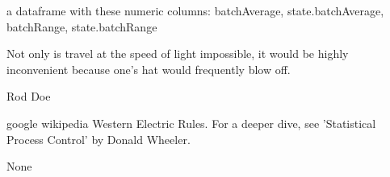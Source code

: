 \documentclass[a4paper]{book}
\begin{document}
%
\begin{Value}
a dataframe with these numeric columns:  batchAverage, state.batchAverage, batchRange, state.batchRange
\end{Value}
%
\begin{Note}\relax
Not only is travel at the speed of light impossible, it would be highly inconvenient because one's hat would frequently blow off.
\end{Note}
%
\begin{Author}\relax
Rod Doe
\end{Author}
%
\begin{References}\relax
google wikipedia Western Electric Rules.  For a deeper dive, see 'Statistical Process Control' by Donald Wheeler.
\end{References}
%
\begin{SeeAlso}\relax
None
\end{SeeAlso}
%
\end{document}
